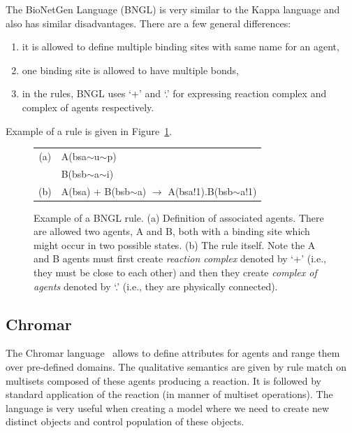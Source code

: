 \documentclass[12pt, twoside]{fithesis2} %
\begin{document}
The BioNetGen Language (BNGL) \cite{BNGL} is very similar to the Kappa language and also has similar disadvantages. There are a few general differences: 

\begin{enumerate}
	\item it is allowed to define multiple binding sites with same name for an agent,
	\item one binding site is allowed to have multiple bonds,
	\item in the rules, BNGL uses `+' and `.' for expressing reaction complex and complex of agents respectively.
\end{enumerate}

Example of a rule is given in Figure~\ref{bngl-rule}.

\begin{figure}[!h]
\begin{center}
\begin{tabular}{c l}
(a) & A(bsa$\sim$u$\sim$p) \\
  & B(bsb$\sim$a$\sim$i) \\
(b) & A(bsa) + B(bsb$\sim$a) $\rightarrow$ A(bsa!1).B(bsb$\sim$a!1) \\
\end{tabular}
\end{center}
\caption{Example of a BNGL rule. (a) Definition of associated agents. There are allowed two agents, A and B, both with a binding site which might occur in two possible states. (b) The rule itself. Note the A and B agents must first create \emph{reaction complex} denoted by `+' (i.e., they must be close to each other) and then they create \emph{complex of agents} denoted by `.' (i.e., they are physically connected).}\label{bngl-rule}
\end{figure}

\subsection{Chromar}

The Chromar language~\cite{honorato2017chromar} allows to define attributes for agents and range them over pre-defined domains. The qualitative semantics are given by rule match on multisets composed of these agents producing a reaction. It is followed by standard application of the reaction (in manner of multiset operations). The language is very useful when creating a model where we need to create new distinct objects and control population of these objects.
\end{document}
